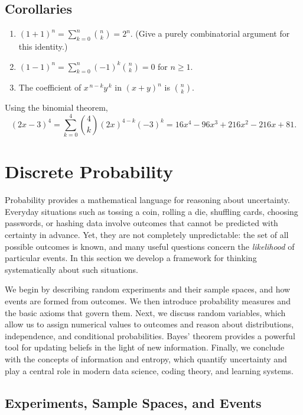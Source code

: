 \subsection*{Corollaries}
\begin{enumerate}
  \item $(1+1)^n = \sum_{k=0}^{n}\binom{n}{k} = 2^{n}$. (Give a purely combinatorial argument for this identity.)
  \item $(1-1)^n = \sum_{k=0}^{n}(-1)^k\binom{n}{k} = 0$ for $n \ge 1$.
  \item The coefficient of $x^{\,n-k}y^{\,k}$ in $(x+y)^n$ is $\binom{n}{k}$.
\end{enumerate}

\begin{example}
Using the binomial theorem,
\[
(2x - 3)^4
= \sum_{k=0}^{4} \binom{4}{k} (2x)^{4-k} (-3)^k
= 16x^4 - 96x^3 + 216x^2 - 216x + 81.
\]
\end{example}

\section{Discrete Probability}

Probability provides a mathematical language for reasoning about uncertainty.
Everyday situations such as tossing a coin, rolling a die, shuffling cards,
choosing passwords, or hashing data involve outcomes that cannot be predicted
with certainty in advance. Yet, they are not completely unpredictable: the set
of all possible outcomes is known, and many useful questions concern the
\emph{likelihood} of particular events. In this section we develop a framework
for thinking systematically about such situations.

We begin by describing random experiments and their sample spaces, and how
events are formed from outcomes. We then introduce probability measures and the
basic axioms that govern them. Next, we discuss random variables, which allow
us to assign numerical values to outcomes and reason about distributions,
independence, and conditional probabilities. Bayes' theorem provides a powerful
tool for updating beliefs in the light of new information. Finally, we conclude
with the concepts of information and entropy, which quantify uncertainty and
play a central role in modern data science, coding theory, and learning systems.

\subsection{Experiments, Sample Spaces, and Events}

